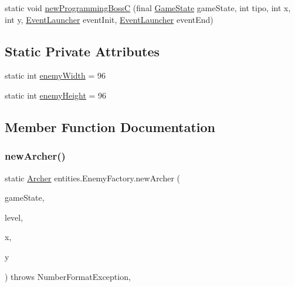 \begin{DoxyCompactItemize}
\item 
static void \mbox{\hyperlink{classentities_1_1_enemy_factory_a7c242d1d38ea0c7aa084b837ec7a77e5}{new\+Programming\+BossC}} (final \mbox{\hyperlink{classstates_1_1_game_state}{Game\+State}} game\+State, int tipo, int x, int y, \mbox{\hyperlink{interfaceentities_1_1_event_launcher}{Event\+Launcher}} event\+Init, \mbox{\hyperlink{interfaceentities_1_1_event_launcher}{Event\+Launcher}} event\+End)
\end{DoxyCompactItemize}
\subsection*{Static Private Attributes}
\begin{DoxyCompactItemize}
\item 
static int \mbox{\hyperlink{classentities_1_1_enemy_factory_a3396d252fc506310c58e3a32494bbe36}{enemy\+Width}} = 96
\item 
static int \mbox{\hyperlink{classentities_1_1_enemy_factory_aa4632fbf138ccc9cc222e7437ccd8284}{enemy\+Height}} = 96
\end{DoxyCompactItemize}


\subsection{Member Function Documentation}
\mbox{\label{classentities_1_1_enemy_factory_a946eb73b35bcc70cc0a9a579f9d25b79}} 
\subsubsection{\texorpdfstring{new\+Archer()}{newArcher()}}
{\footnotesize\ttfamily static \mbox{\hyperlink{classentities_1_1_archer}{Archer}} entities.\+Enemy\+Factory.\+new\+Archer (\begin{DoxyParamCaption}\item[{\mbox{\hyperlink{classstates_1_1_game_state}{Game\+State}}}]{game\+State,  }\item[{int}]{level,  }\item[{int}]{x,  }\item[{int}]{y }\end{DoxyParamCaption}) throws Number\+Format\+Exception\hspace{0.3cm}{\ttfamily [inline]}, {\ttfamily [static]}}


